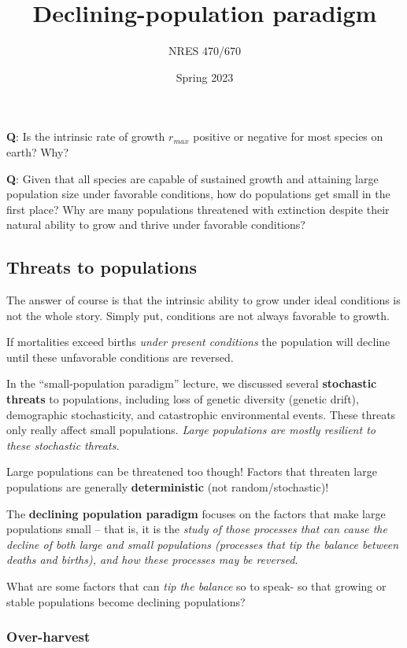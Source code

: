 \documentclass[
]{article}
\title{Declining-population paradigm}
\author{NRES 470/670}
\date{Spring 2023}
\begin{document}
\maketitle

{
\setcounter{tocdepth}{2}
\tableofcontents
}
\textbf{Q}: Is the intrinsic rate of growth \(r_{max}\) positive or
negative for most species on earth? Why?

\textbf{Q}: Given that all species are capable of sustained growth and
attaining large population size under favorable conditions, how do
populations get small in the first place? Why are many populations
threatened with extinction despite their natural ability to grow and
thrive under favorable conditions?

\hypertarget{threats-to-populations}{%
\subsection{Threats to populations}\label{threats-to-populations}}

The answer of course is that the intrinsic ability to grow under ideal
conditions is not the whole story. Simply put, conditions are not always
favorable to growth.

If mortalities exceed births \emph{under present conditions} the
population will decline until these unfavorable conditions are reversed.

In the ``small-population paradigm'' lecture, we discussed several
\textbf{stochastic threats} to populations, including loss of genetic
diversity (genetic drift), demographic stochasticity, and catastrophic
environmental events. These threats only really affect small
populations. \emph{Large populations are mostly resilient to these
stochastic threats.}

Large populations can be threatened too though! Factors that threaten
large populations are generally \textbf{deterministic} (not
random/stochastic)!

The \textbf{declining population paradigm} focuses on the factors that
make large populations small -- that is, it is the \emph{study of those
processes that can cause the decline of both large and small populations
(processes that tip the balance between deaths and births), and how
these processes may be reversed}.

What are some factors that can \emph{tip the balance} so to speak- so
that growing or stable populations become declining populations?

\hypertarget{over-harvest}{%
\subsubsection{Over-harvest}\label{over-harvest}}
\end{document}
